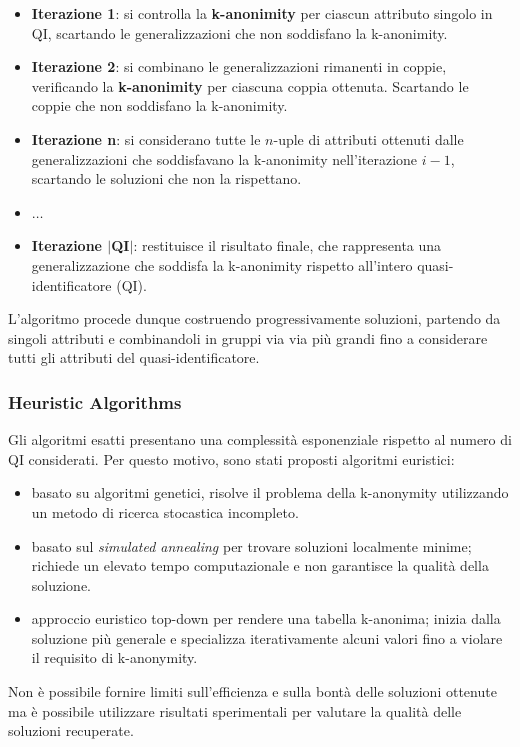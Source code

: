\documentclass{report}
\begin{document}
\begin{itemize}
    \item \textbf{Iterazione 1}: si controlla la \textbf{k-anonimity} per ciascun attributo singolo in QI, scartando le generalizzazioni che non soddisfano la k-anonimity.
    \item \textbf{Iterazione 2}: si combinano le generalizzazioni rimanenti in coppie, verificando la \textbf{k-anonimity} per ciascuna coppia ottenuta. Scartando le coppie che non soddisfano la k-anonimity.
    \item \textbf{Iterazione n}: si considerano tutte le $n$-uple di attributi ottenuti dalle generalizzazioni che soddisfavano la k-anonimity nell'iterazione $i-1$, scartando le soluzioni che non la rispettano.
    \item $\ldots$
    \item \textbf{Iterazione $|$QI$|$}: restituisce il risultato finale, che rappresenta una generalizzazione che soddisfa la k-anonimity rispetto all'intero quasi-identificatore (QI).
\end{itemize}

\noindent L'algoritmo procede dunque costruendo progressivamente soluzioni, partendo da singoli attributi e combinandoli in gruppi via via più grandi fino a considerare tutti gli attributi del quasi-identificatore.

\subsubsection{Heuristic Algorithms}
Gli algoritmi esatti presentano una complessità esponenziale rispetto al numero di QI considerati. Per questo motivo, sono stati proposti algoritmi euristici:

\begin{itemize}
    \item basato su algoritmi genetici, risolve il problema della k-anonymity utilizzando un metodo di ricerca stocastica incompleto.
    \item basato sul \textit{simulated annealing} per trovare soluzioni localmente minime; richiede un elevato tempo computazionale e non garantisce la qualità della soluzione.
    \item approccio euristico top-down per rendere una tabella k-anonima; inizia dalla soluzione più generale e specializza iterativamente alcuni valori fino a violare il requisito di k-anonymity.
\end{itemize}

\noindent Non è possibile fornire limiti sull'efficienza e sulla bontà delle soluzioni ottenute ma è possibile utilizzare risultati sperimentali per valutare la qualità delle soluzioni recuperate.
\end{document}
